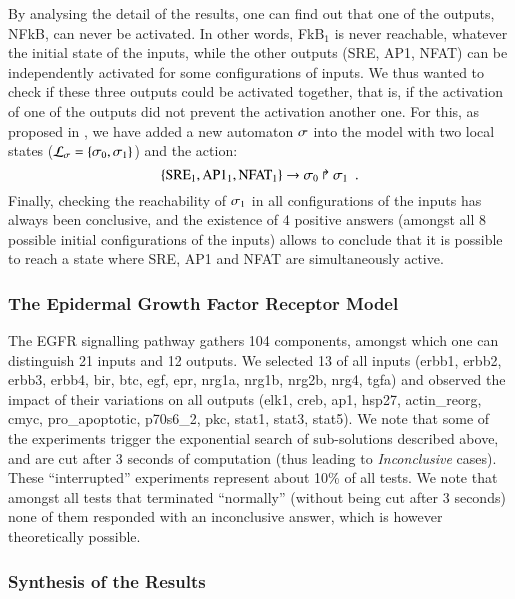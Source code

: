 By analysing the detail of the results, one can find out that one of the outputs, NFkB, can never be activated.
In other words, FkB$_1$ is never reachable, whatever the initial state of the inputs,
while the other outputs (SRE, AP1, NFAT) can be independently activated
for some configurations of inputs.
We thus wanted to check if these three outputs could be activated together,
that is, if the activation of one of the outputs did not prevent the activation another one.
For this, as proposed in ,
we have added a new automaton $\sigma$ into the model
with two local states ($\mathcal{L}_\sigma = \{ \sigma_0, \sigma_1 \}$)
and the action:
\[ \{\text{SRE}_1, \text{AP1}_1, \text{NFAT}_1\}\rightarrow\sigma_0\Rsh\sigma_1 \enspace. \]
Finally, checking the reachability of $\sigma_1$ in all configurations of the inputs
has always been conclusive,
and the existence of 4 positive answers
(amongst all 8 possible initial configurations of the inputs) allows to conclude that
it is possible to reach a state where SRE, AP1 and NFAT are simultaneously active.

\subsubsection*{The Epidermal Growth Factor Receptor Model}

The EGFR signalling pathway gathers 104 components, amongst which one can distinguish
21 inputs and 12 outputs.
We selected 13 of all inputs
(erbb1, erbb2, erbb3, erbb4, bir, btc, egf, epr, nrg1a, nrg1b, nrg2b, nrg4, tgfa)
and observed the impact of their variations on all outputs
(elk1, creb, ap1, hsp27, actin\_reorg, cmyc, pro\_apoptotic, p70s6\_2, pkc, stat1, stat3, stat5).
We note that some of the experiments trigger the exponential search
of sub-solutions described above, and are cut after 3 seconds of computation
(thus leading to \emph{Inconclusive} cases).
These “interrupted” experiments represent about 10\% of all tests.
We note that amongst all tests that terminated “normally” (without being cut after 3 seconds)
none of them responded with an inconclusive answer, which is however theoretically possible.

\subsubsection*{Synthesis of the Results}

